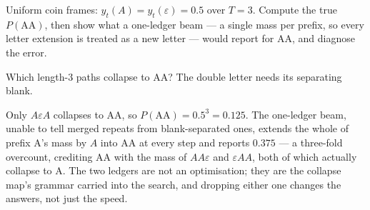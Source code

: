 \begin{problem}[stretch]
Uniform coin frames: $y_t(A) = y_t(\varepsilon) = 0.5$ over $T = 3$.
Compute the true $P(\mathrm{AA})$, then show what a one-ledger beam —
a single mass per prefix, so every letter extension is treated as a
new letter — would report for AA, and diagnose the error.
\begin{hint}
Which length-$3$ paths collapse to AA? The double letter needs its
separating blank.
\end{hint}
\begin{solution}
Only $A\varepsilon A$ collapses to AA, so $P(\mathrm{AA}) =
0.5^3 = 0.125$. The one-ledger beam, unable to tell merged repeats
from blank-separated ones, extends the whole of prefix A's mass by
$A$ into AA at every step and reports $0.375$ — a three-fold
overcount, crediting AA with the mass of $AA\varepsilon$ and
$\varepsilon AA$, both of which actually collapse to A. The two ledgers are not an
optimisation; they are the collapse map's grammar carried into the
search, and dropping either one changes the answers, not just the
speed.
\end{solution}
\end{problem}
